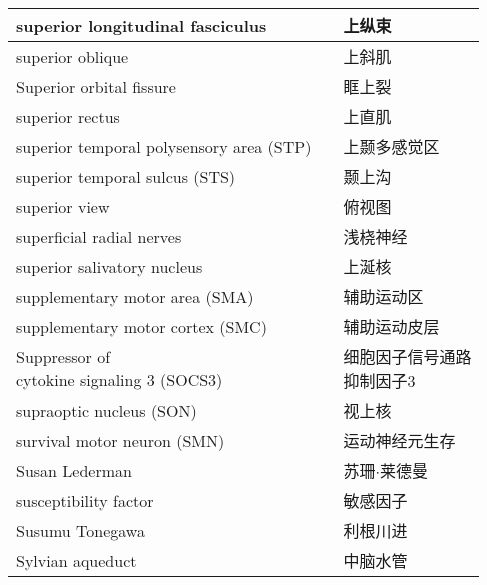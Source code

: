 \begin{longtable}{lll}
	\midrule
	superior longitudinal fasciculus   && 上纵束 \\
	
	\midrule
	superior oblique   && 上斜肌 \\
	
	\midrule
	Superior orbital fissure   && 眶上裂 \\
	
	\midrule
	superior rectus   && 上直肌 \\
	
	\midrule
	superior temporal polysensory area (STP)   && 上颞多感觉区 \\
	
	\midrule
	superior temporal sulcus (STS)   && 颞上沟 \\
	
	\midrule
	superior view   && 俯视图 \\
	
	\midrule
	superficial radial nerves   && 浅桡神经 \\
	
	\midrule
	superior salivatory nucleus   && 上涎核 \\
	
	\midrule
	supplementary motor area (SMA)   && 辅助运动区 \\
	
	\midrule
	supplementary motor cortex (SMC)   && 辅助运动皮层 \\
	
	\midrule
	\makecell[l]{Suppressor of \\cytokine signaling 3 (SOCS3)}  && \makecell[l]{细胞因子信号通路\\抑制因子3} \\
	
	\midrule
	supraoptic nucleus (SON)  && 视上核 \\
	
	\midrule
	survival motor neuron (SMN) && 运动神经元生存 \\
	
	\midrule
	Susan Lederman && 苏珊$\cdot$莱德曼 \\
	
	\midrule
	susceptibility factor && 敏感因子 \\
	
	\midrule
	Susumu Tonegawa && 利根川进 \\
	
	\midrule
	Sylvian aqueduct && 中脑水管 \\
	

\end{longtable}
